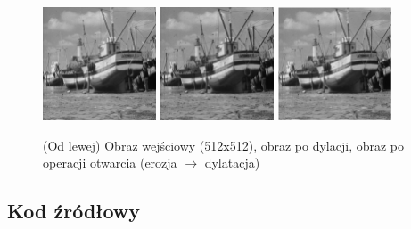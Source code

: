 \documentclass[final,a4paper,openany,12pt]{mwbk}
\begin{document}
\begin{figure}[H]
	\begin{center}
		\includegraphics[width=0.3\textwidth]{2/2Gray_Op_Original}
		\includegraphics[width=0.3\textwidth]{2/2Gray_Op_E_Result}
		\includegraphics[width=0.3\textwidth]{2/2Gray_Op_ED_Result}
	\end{center}
	\caption{(Od lewej) Obraz wejściowy (512x512), obraz po dylacji, obraz po operacji otwarcia (erozja $\rightarrow$ dylatacja)}
\end{figure}


\subsection*{Kod źródłowy}
\end{document}
